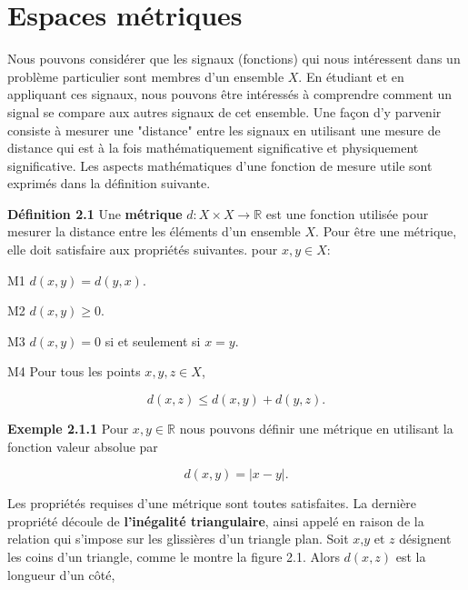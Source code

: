 \documentclass[11pt,twoside,a4paper]{article}
\begin{document}
\section{Espaces métriques}

Nous pouvons considérer que les signaux (fonctions) qui nous intéressent dans un problème particulier sont membres d'un ensemble $X$. En étudiant et en appliquant ces signaux, nous pouvons être intéressés à comprendre 
comment un signal se compare aux autres signaux de cet ensemble. Une façon d'y parvenir consiste à mesurer une "distance" entre les signaux en utilisant une mesure de distance qui est à la fois mathématiquement significative 
et physiquement significative. Les aspects mathématiques d'une fonction de mesure utile sont exprimés dans la définition suivante.

\vspace{5mm}

\textbf{Définition 2.1} Une \textbf{métrique} $d: X \times X \longrightarrow \mathbb{R}$ est une fonction utilisée pour mesurer la distance entre les éléments d'un ensemble $X$. 
Pour être une métrique, elle doit satisfaire aux propriétés suivantes. pour $x, y \in \textit{X}$:
\vspace{2mm}

M1 $d(x, y) = d(y, x)$.

M2 $d(x, y) \geq 0$.

M3 $d(x, y) = 0$ si et seulement si $x = y$.

M4 Pour tous les points $x, y, z \in \textit{X}$,

\begin{equation}
       d(x, z) \leq d(x, y) + d(y, z).
\end{equation}

\vspace{10mm}

\textbf{Exemple 2.1.1} Pour $x, y \in \mathbb{R}$ nous pouvons définir une métrique en utilisant la fonction valeur absolue par

\begin{equation*}
       d(x, y) = |x - y|.
\end{equation*}

Les propriétés requises d'une métrique sont toutes satisfaites. La dernière propriété découle de \textbf{l'inégalité triangulaire}, 
ainsi appelé en raison de la relation qui s'impose sur les glissières d'un triangle plan. Soit $x$,$y$ et $z$ désignent les coins d'un triangle, 
comme le montre la figure 2.1. Alors $d(x, z)$ est la longueur d'un côté,
\end{document}
